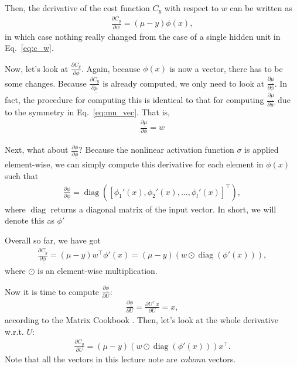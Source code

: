 \documentclass{report}
\newcommand{\diag}[0]{\operatorname{diag}}
\begin{document}
Then, the derivative of the cost function $C_y$ with respect to $w$ can be
written as
\begin{align*}
    \frac{\partial C_y}{\partial w} = (\mu -y) \phi(x),
\end{align*}
in which case nothing really changed from the case of a single hidden unit in
Eq.~\eqref{eq:c_w}.

Now, let's look at $\frac{\partial C_y}{\partial \phi}$. Again, because
$\phi(x)$ is now a vector, there has to be some changes. Because $\frac{\partial
C_y}{\partial \underline{\mu}}$ is already computed, we only need to look at
$\frac{\partial \underline{\mu}}{\partial \phi}$. In fact, the procedure for
computing this is identical to that for computing $\frac{\partial
\underline{\mu}}{\partial w}$ due to the symmetry in Eq.~\eqref{eq:mu_vec}. That
is,
\begin{align*}
    \frac{\partial \underline{\mu}}{\partial \phi} = w
\end{align*}

Next, what about $\frac{\partial \phi}{\partial \underline{\phi}}$? Because the
nonlinear activation function $\sigma$ is applied element-wise, we can simply
compute this derivative for each element in $\phi(x)$ such that
\begin{align*}
    \frac{\partial \phi}{\partial \underline{\phi}} = 
    \diag\left(\left[ \phi_1'(x), \phi_2'(x), \ldots, \phi_l'(x)
    \right]^\top\right),
\end{align*}
where $\diag$ returns a diagonal matrix of the input vector. In short, we will
denote this as $\phi'$

Overall so far, we have got
\begin{align*}
    \frac{\partial C_y}{\partial \underline{\phi}} = 
    (\mu - y)w^\top \phi'(x) = (\mu - y) (w \odot \diag(\phi'(x))),
\end{align*}
where $\odot$ is an element-wise multiplication.

Now it is time to compute $\frac{\partial
\underline{\phi}}{\partial U}$:
\begin{align*}
    \frac{\partial \underline{\phi}}{\partial U} = \frac{\partial U^\top
    x}{\partial U} = x,
\end{align*}
according to the Matrix Cookbook \cite{petersen2008matrix}. Then, let's look at
the whole derivative w.r.t. $U$:
\begin{align*}
    \frac{\partial C_y}{\partial U} = (\mu - y) (w \odot \diag(\phi'(x)))
    x^\top.
\end{align*}
Note that all the vectors in this lecture note are {\em column} vectors.
\end{document}
